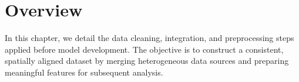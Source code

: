 \section{Overview}

In this chapter, we detail the data cleaning, integration, and preprocessing steps applied before model development. 
The objective is to construct a consistent, spatially aligned dataset by merging heterogeneous data sources and preparing meaningful features for subsequent analysis.





